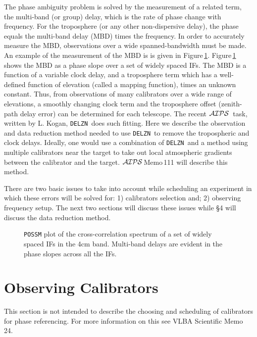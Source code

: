 \documentclass[preprint]{aastex}
\newcommand{\AIPS}{{$\cal AIPS\/$}}
\newcommand{\DELZN}{{\tt DELZN}}
\begin{document}
    The phase ambiguity problem is solved by the measurement of a
related term, the multi-band (or group) delay, which is the rate of
phase change with frequency.  For the troposphere (or any other
non-dispersive delay), the phase equals the multi-band delay (MBD)
times the frequency.  In order to accurately measure the MBD,
observations over a wide spanned-bandwidth must be made.  An example
of the measurement of the MBD is is given in Figure\,\ref{predelzn}.
Figure\,\ref{predelzn} shows the MBD as a phase slope over
a set of widely spaced IFs.
The MBD is a function of a variable clock delay, and a troposphere
term which has a well-defined function of elevation (called a mapping
function), times an unknown constant.  Thus, from observations of many
calibrators over a wide range of elevations, a smoothly changing clock
term and the troposphere offset (zenith-path delay error) can be
determined for each telescope.  The recent \AIPS\ task, written by L. Kogan,
\DELZN\ does such fitting.  Here we
describe the observation and data reduction method needed to use \DELZN\
to remove the tropospheric and clock delays.  Ideally, one would use a
combination of \DELZN\ and a method using
multiple calibrators near the target to take out local atmospheric gradients
between the calibrator and the target.  \AIPS\,Memo\,111 will describe this
method.

There are two basic issues to take into account while scheduling an experiment
in which these errors will be solved for: 1) calibrators selection and;
2) observing frequency setup.  The next two sections will discuss these issues
while \S 4 will discuss the data reduction method.

\begin{figure}[t!]
\caption{{\tt POSSM} plot of the cross-correlation spectrum of a set of
widely spaced IFs in the 4cm band. Multi-band delays are evident in the
phase slopes across all the IFs.}
\label{predelzn}
\end{figure}

\section{Observing Calibrators}

This section is not intended to describe the choosing and scheduling of
calibrators for phase referencing.  For more information on this see VLBA
Scientific Memo 24.
\end{document}
